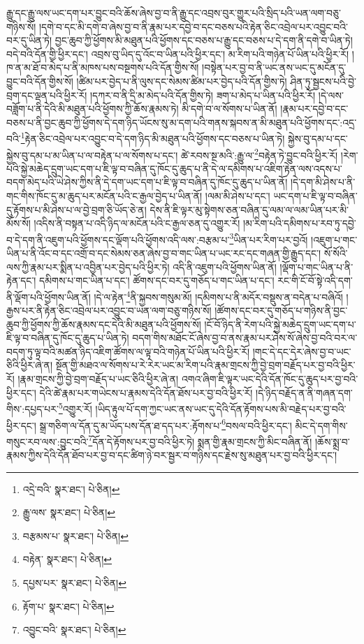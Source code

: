 རྒྱུ་དང་རྒྱུ་ལས་ཡང་དག་པར་བྱུང་བའི་ཆོས་ཞེས་བྱ་བ་ནི་རྒྱུ་དང་འབྲས་བུར་གྱུར་པའི་སྲིད་པའི་ཡན་ལག་བཅུ་གཉིས་སོ། །དགེ་བ་དང་མི་དགེ་བ་ཞེས་བྱ་བ་ནི་རྣམ་པར་དབྱེ་བ་དང་བཅས་པའི་རྟེན་ཅིང་འབྲེལ་པར་འབྱུང་བའི་བར་དུ་ཡིན་ཏེ། བྱང་ཆུབ་ཀྱི་ཕྱོགས་མི་མཐུན་པའི་ཕྱོགས་དང་བཅས་པ་རྒྱུ་དང་བཅས་པ་དེ་དག་ནི་དགེ་བ་ཡིན་ཏེ། བདེ་བའི་དོན་གྱི་ཕྱིར་དང་། འབྲས་བུ་ཡིད་དུ་འོང་བ་ཡིན་པའི་ཕྱིར་དང་། མ་རིག་པའི་གཉེན་པོ་ཡིན་པའི་ཕྱིར་རོ། །ཁ་ན་མ་ཐོ་བ་མེད་པ་ནི་མཁས་པས་བསྔགས་པའི་དོན་གྱིས་སོ། །བསྟེན་པར་བྱ་བ་ནི་ཡང་ནས་ཡང་དུ་མངོན་དུ་བྱུང་བའི་དོན་གྱིས་སོ། །ཚིམ་པར་བྱེད་པ་ནི་ལུས་དང་སེམས་ཚིམ་པར་བྱེད་པའི་དོན་གྱིས་ཏེ། ཤིན་ཏུ་སྦྱངས་པའི་བྱེ་བྲག་དང་ལྡན་པའི་ཕྱིར་རོ། །དཀར་བ་ནི་དྲི་མ་མེད་པའི་དོན་གྱིས་ཏེ། ཟག་པ་མེད་པ་ཡིན་པའི་ཕྱིར་རོ། །དེ་ལས་བཟློག་པ་ནི་དེའི་མི་མཐུན་པའི་ཕྱོགས་ཀྱི་ཆོས་རྣམས་ཏེ། མི་དགེ་བ་ལ་སོགས་པ་ཡིན་ནོ། །རྣམ་པར་དབྱེ་བ་དང་བཅས་པ་ནི་བྱང་ཆུབ་ཀྱི་ཕྱོགས་དེ་དག་ཉིད་ཡོངས་སུ་མ་དག་པའི་གནས་སྐབས་ན་མི་མཐུན་པའི་ཕྱོགས་དང་:འདྲ་བའི་\footnote{འདྲེ་བའི་  སྣར་ཐང་།  པེ་ཅིན། }རྟེན་ཅིང་འབྲེལ་པར་འབྱུང་བ་དེ་དག་ཉིད་མི་མཐུན་པའི་ཕྱོགས་དང་བཅས་པ་ཡིན་ཏེ། སྐྱེས་བུ་དམ་པ་དང་སྐྱེས་བུ་དམ་པ་མ་ཡིན་པ་ལ་བརྟེན་པ་ལ་སོགས་པ་དང་། ཚེ་རབས་སྔ་མའི་:རྒྱུ་ལ་\footnote{རྒྱུ་ལས་  སྣར་ཐང་།  པེ་ཅིན། }བརྟེན་ཏེ་བྱུང་བའི་ཕྱིར་རོ། །རེག་པའི་སྐྱེ་མཆེད་དྲུག་ཡང་དག་པ་ཇི་ལྟ་བ་བཞིན་དུ་ཁོང་དུ་ཆུད་པ་ནི་དེ་ལ་དམིགས་པ་འཇིག་རྟེན་ལས་འདས་པ་བདག་མེད་པའི་ཡེ་ཤེས་ཀྱིས་ནི་དེ་དག་ཡང་དག་པ་ཇི་ལྟ་བ་བཞིན་དུ་ཁོང་དུ་ཆུད་པ་ཡིན་ནོ། །དེ་དག་མི་ཤེས་པ་ནི་གང་གིས་ཁོང་དུ་མ་ཆུད་པར་མངོན་པའི་ང་རྒྱལ་བྱེད་པ་ཡིན་ནོ། །ལམ་མི་ཤེས་པ་དང་། ཡང་དག་པ་ཇི་ལྟ་བ་བཞིན་དུ་རྟོགས་པ་མི་ཤེས་པ་ལ་བྱེ་བྲག་ཅི་ཡོད་ཅེ་ན། དེས་ནི་ཇི་ལྟར་མུ་སྟེགས་ཅན་བཞིན་དུ་ལམ་ལ་ལམ་ཡིན་པར་མི་མོས་སོ། །འདིས་ནི་བསྟན་པ་འདི་ཉིད་ལ་མངོན་པའི་ང་རྒྱལ་ཅན་དུ་འགྱུར་རོ། །མ་རིག་པའི་དམིགས་པ་རབ་ཏུ་དབྱེ་བ་དེ་དག་ནི་འཇུག་པའི་ཕྱོགས་དང་ལྡོག་པའི་ཕྱོགས་འདི་ལས་:བརྩམ་པ་\footnote{བརྩམས་པ་  སྣར་ཐང་།  པེ་ཅིན། }ཡིན་པར་རིག་པར་བྱའོ། །འཇུག་པ་གང་ཡིན་པ་ནི་འོང་བ་དང་འགྲོ་བ་དང་སེམས་ཅན་ཞེས་བྱ་བ་གང་ཡིན་པ་ཡང་རང་དང་གཞན་གྱི་རྒྱུད་དང་། སོ་སོའི་ལས་ཀྱི་རྣམ་པར་སྨིན་པ་འབྱིན་པར་བྱེད་པའི་ཕྱིར་ཏེ། འདི་ནི་འཇུག་པའི་ཕྱོགས་ཡིན་ནོ། །ལྡོག་པ་གང་ཡིན་པ་ནི་རྟེན་དང་། དམིགས་པ་གང་ཡིན་པ་དང་། ཚོགས་དང་བར་དུ་གཅོད་པ་གང་ཡིན་པ་དང་། རང་གི་ངོ་བོ་སྟེ་འདི་དག་ནི་ལྡོག་པའི་ཕྱོགས་ཡིན་ནོ། །དེ་ལ་རྟེན་\footnote{བརྟེན་  སྣར་ཐང་།  པེ་ཅིན། }ནི་སྐྱབས་གསུམ་མོ། །དམིགས་པ་ནི་མདོར་བསྡུས་ན་བདེན་པ་བཞིའོ། །རྒྱས་པར་ནི་རྟེན་ཅིང་འབྲེལ་པར་འབྱུང་བ་ཡན་ལག་བཅུ་གཉིས་སོ། །ཚོགས་དང་བར་དུ་གཅོད་པ་གཉིས་ནི་བྱང་ཆུབ་ཀྱི་ཕྱོགས་ཀྱི་ཆོས་རྣམས་དང་དེའི་མི་མཐུན་པའི་ཕྱོགས་སོ། །ངོ་བོ་ཉིད་ནི་རེག་པའི་སྐྱེ་མཆེད་དྲུག་ཡང་དག་པ་ཇི་ལྟ་བ་བཞིན་དུ་ཁོང་དུ་ཆུད་པ་ཡིན་ཏེ། བདག་གིས་མཐོང་ངོ་ཞེས་བྱ་བ་ནས་རྣམ་པར་ཤེས་སོ་ཞེས་བྱ་བའི་བར་ལ་བདག་ཏུ་ལྟ་བའི་མཚན་ཉིད་འཇིག་ཚོགས་ལ་ལྟ་བའི་གཉེན་པོ་ཡིན་པའི་ཕྱིར་རོ། །གང་དེ་དང་དེར་ཞེས་བྱ་བ་ཡང་ཅིའི་ཕྱིར་ཞེ་ན། སྔོན་གྱི་མཐའ་ལ་སོགས་པ་རེ་རེར་ཡང་མ་རིག་པའི་རྣམ་གྲངས་ཀྱི་བྱེ་བྲག་བརྗོད་པར་བྱ་བའི་ཕྱིར་རོ། །རྣམ་གྲངས་ཀྱི་བྱེ་བྲག་བརྗོད་པ་ཡང་ཅིའི་ཕྱིར་ཞེ་ན། འགའ་ཞིག་ཇི་ལྟར་ཡང་དེའི་དོན་ཁོང་དུ་ཆུད་པར་བྱ་བའི་ཕྱིར་དང་། དེའི་ཚེ་རྣམ་པར་གཡེངས་པ་རྣམས་དེའི་དོན་ཐོས་པར་བྱ་བའི་ཕྱིར་རོ། །དེ་ཉིད་བརྗོད་ན་ནི་གཞན་དག་གིས་:དཔྱད་པར་\footnote{དཔྱས་པར་  སྣར་ཐང་།  པེ་ཅིན། }འགྱུར་རོ། །ཡིད་རྟུལ་པོ་དག་ཀྱང་ཡང་ནས་ཡང་དུ་དེའི་དོན་རྟོགས་པས་མི་བརྗེད་པར་བྱ་བའི་ཕྱིར་དང་། སྒྲ་གཅིག་ལ་དོན་དུ་མ་ཡོད་པས་དོན་ཐ་དད་པར་:རྟོགས་པ་\footnote{རྟོག་པ་  སྣར་ཐང་།  པེ་ཅིན། }བསལ་བའི་ཕྱིར་དང་། མིང་དེ་དག་གིས་གསུང་རབ་ལས་:བྱུང་བའི་\footnote{འབྱུང་བའི་  སྣར་ཐང་།  པེ་ཅིན། }དོན་དེ་རྟོགས་པར་བྱ་བའི་ཕྱིར་ཏེ། སྨན་གྱི་རྣམ་གྲངས་ཀྱི་མིང་བཞིན་ནོ། །ཆོས་སྨྲ་བ་རྣམས་ཀྱིས་དེའི་དོན་ཐོབ་པར་བྱ་བ་དང་ཚིག་ཉེ་བར་སྦྱར་བ་གཉིས་དང་རྗེས་སུ་མཐུན་པར་བྱ་བའི་ཕྱིར་དང་། 